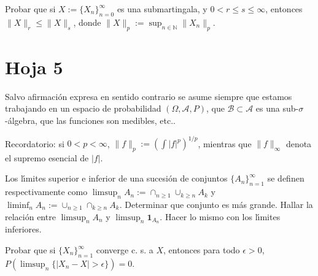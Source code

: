 
\begin{problem}[4] Probar que si $X := \{X_n\}_{n=0}^{\infty}$  es una submartingala, y 
$0  <  r\le s\le \infty$, entonces $\|X\|_r  \le \|X\|_s$, donde 
$\|X\|_p := \sup_{n\in \mathbb{N}} \|X_n\|_{p}$. 
\solution

\begin{expla}

\end{expla}

\end{problem}



\newpage
\section{Hoja 5}

Salvo afirmaci\'on expresa en sentido
contrario se asume siempre que estamos trabajando en un espacio de probabilidad $(\Omega, \mathcal{A}, P)$,
que  $\mathcal{B}\subset \mathcal{A}$ es una sub-$\sigma$-\'algebra, que las funciones son medibles, etc..

Recordatorio: si $0 < p < \infty$, $\|f\|_p := \left(\int|f|^p\right)^{1/p}$, mientras que
$\|f\|_\infty$ denota el supremo esencial de $|f|$. 

\begin{problem}[1] Los l\'{\i}mites superior e inferior de una sucesi\'on de conjuntos  $\{A_n\}_{n=1}^{\infty}  $ se
definen respectivamente como $\limsup_n A_n := \cap_{n\ge 1 } \cup_{k\ge n } A_k$ y 
$\liminf_n A_n := \cup_{n\ge 1 } \cap_{k\ge n } A_k$. Determinar que conjunto es m\'as grande.
Hallar la relaci\'on entre  $\limsup_n A_n$ y  $\limsup_n \mathbf{1}_{ A_n}$. Hacer lo mismo con los
 l\'{\i}mites inferiores.
\solution

\begin{expla}

\end{expla}

\end{problem}


\begin{problem}[2] Probar que si $\{X_n\}_{n=1}^{\infty}$  converge c. s. a $X$, entonces para todo $\epsilon > 0$,
$P(\limsup_n\{ |X_n - X| > \epsilon\}) = 0$.
\solution

\begin{expla}

\end{expla}

\end{problem}

